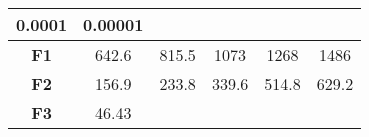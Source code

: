 \documentclass[12pt,a4paper]{article}
\begin{document}
\begin{longtable}[c]{@{}cccccc@{}}
\begin{minipage}[b]{0.10\columnwidth}
0.0001
\strut\end{minipage} &
\begin{minipage}[b]{0.10\columnwidth}\centering\strut
0.00001
\strut\end{minipage}\tabularnewline
\midrule
\endhead
\begin{minipage}[t]{0.12\columnwidth}\centering\strut
\textbf{F1}
\strut\end{minipage} &
\begin{minipage}[t]{0.08\columnwidth}\centering\strut
642.6
\strut\end{minipage} &
\begin{minipage}[t]{0.08\columnwidth}\centering\strut
815.5
\strut\end{minipage} &
\begin{minipage}[t]{0.09\columnwidth}\centering\strut
1073
\strut\end{minipage} &
\begin{minipage}[t]{0.10\columnwidth}\centering\strut
1268
\strut\end{minipage} &
\begin{minipage}[t]{0.10\columnwidth}\centering\strut
1486
\strut\end{minipage}\tabularnewline
\begin{minipage}[t]{0.12\columnwidth}\centering\strut
\textbf{F2}
\strut\end{minipage} &
\begin{minipage}[t]{0.08\columnwidth}\centering\strut
156.9
\strut\end{minipage} &
\begin{minipage}[t]{0.08\columnwidth}\centering\strut
233.8
\strut\end{minipage} &
\begin{minipage}[t]{0.09\columnwidth}\centering\strut
339.6
\strut\end{minipage} &
\begin{minipage}[t]{0.10\columnwidth}\centering\strut
514.8
\strut\end{minipage} &
\begin{minipage}[t]{0.10\columnwidth}\centering\strut
629.2
\strut\end{minipage}\tabularnewline
\begin{minipage}[t]{0.12\columnwidth}\centering\strut
\textbf{F3}
\strut\end{minipage} &
\begin{minipage}[t]{0.08\columnwidth}\centering\strut
46.43
\strut\end{minipage} &
\begin{minipage}[t]{0.08\columnwidth}\centering\strut

\end{minipage}
\end{longtable}
\end{document}
